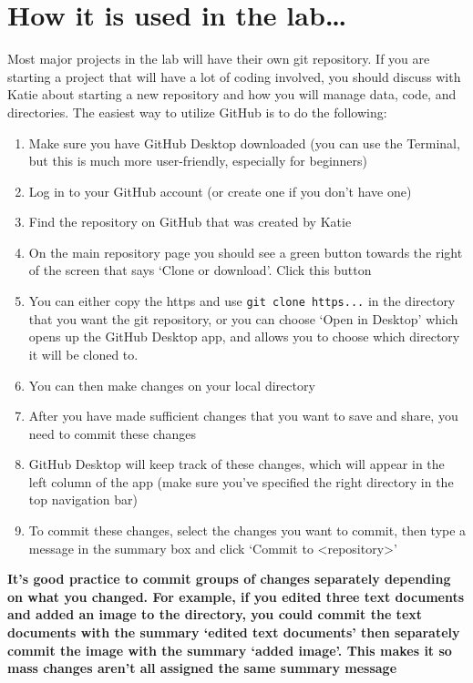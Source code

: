 \documentclass[
  letterpaper,
  DIV=11,
  numbers=noendperiod]{scrreprt}
\begin{document}
\hypertarget{how-it-is-used-in-the-lab}{%
\section*{\texorpdfstring{\textbf{How it is used in the
lab\ldots{}}}{How it is used in the lab\ldots{}}}\label{how-it-is-used-in-the-lab}}

Most major projects in the lab will have their own git repository. If
you are starting a project that will have a lot of coding involved, you
should discuss with Katie about starting a new repository and how you
will manage data, code, and directories. The easiest way to utilize
GitHub is to do the following:

\begin{enumerate}
\def\labelenumi{\arabic{enumi}.}
\item
  Make sure you have GitHub Desktop downloaded (you can use the
  Terminal, but this is much more user-friendly, especially for
  beginners)
\item
  Log in to your GitHub account (or create one if you don't have one)
\item
  Find the repository on GitHub that was created by Katie
\item
  On the main repository page you should see a green button towards the
  right of the screen that says `Clone or download'. Click this button
\item
  You can either copy the https and use \texttt{git\ clone\ https...} in
  the directory that you want the git repository, or you can choose
  `Open in Desktop' which opens up the GitHub Desktop app, and allows
  you to choose which directory it will be cloned to.
\item
  You can then make changes on your local directory
\item
  After you have made sufficient changes that you want to save and
  share, you need to commit these changes
\item
  GitHub Desktop will keep track of these changes, which will appear in
  the left column of the app (make sure you've specified the right
  directory in the top navigation bar)
\item
  To commit these changes, select the changes you want to commit, then
  type a message in the summary box and click `Commit to
  \textless repository\textgreater{}'
\end{enumerate}

\textbf{It's good practice to commit groups of changes separately
depending on what you changed. For example, if you edited three text
documents and added an image to the directory, you could commit the text
documents with the summary `edited text documents' then separately
commit the image with the summary `added image'. This makes it so mass
changes aren't all assigned the same summary message}
\end{document}
